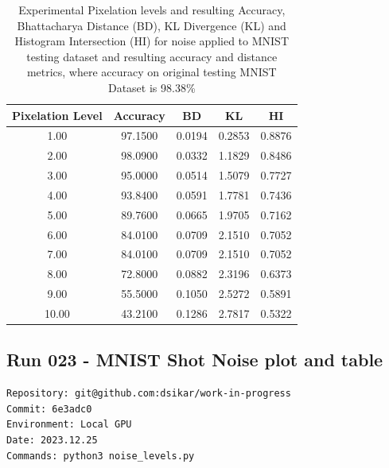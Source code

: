 \begin{table}[ht]
\centering
\begin{tabular}{|c|c|c|c|c|}
\hline
Pixelation Level & Accuracy & BD & KL & HI \\
\hline
1.00 & 97.1500 & 0.0194 & 0.2853 & 0.8876 \\
2.00 & 98.0900 & 0.0332 & 1.1829 & 0.8486 \\
3.00 & 95.0000 & 0.0514 & 1.5079 & 0.7727 \\
4.00 & 93.8400 & 0.0591 & 1.7781 & 0.7436 \\
5.00 & 89.7600 & 0.0665 & 1.9705 & 0.7162 \\
6.00 & 84.0100 & 0.0709 & 2.1510 & 0.7052 \\
7.00 & 84.0100 & 0.0709 & 2.1510 & 0.7052 \\
8.00 & 72.8000 & 0.0882 & 2.3196 & 0.6373 \\
9.00 & 55.5000 & 0.1050 & 2.5272 & 0.5891 \\
10.00 & 43.2100 & 0.1286 & 2.7817 & 0.5322 \\
\hline
\end{tabular}
\caption{Experimental Pixelation levels and resulting Accuracy, Bhattacharya Distance (BD), KL Divergence (KL) and Histogram Intersection (HI) for noise applied to MNIST testing dataset and resulting accuracy and distance metrics, where accuracy on original testing MNIST Dataset is 98.38\%}
\label{tbl-pixelation-levels}
\end{table}

\subsection{Run 023 - MNIST Shot Noise plot and table}
\label{app_res:023}
\begin{verbatim}
Repository: git@github.com:dsikar/work-in-progress
Commit: 6e3adc0
Environment: Local GPU
Date: 2023.12.25
Commands: python3 noise_levels.py
\end{verbatim}

